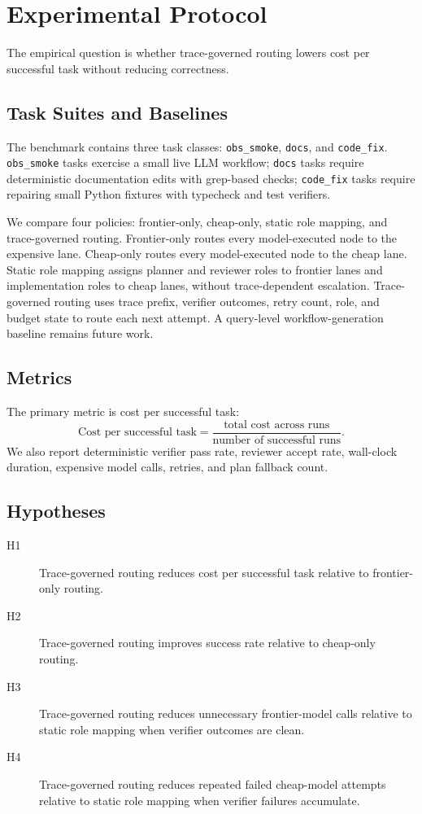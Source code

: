 \documentclass[11pt]{article}
\begin{document}
\section{Experimental Protocol}

The empirical question is whether trace-governed routing lowers cost per
successful task without reducing correctness.

\subsection{Task Suites and Baselines}

The benchmark contains three task classes: \texttt{obs\_smoke},
\texttt{docs}, and \texttt{code\_fix}. \texttt{obs\_smoke} tasks exercise a
small live LLM workflow; \texttt{docs} tasks require deterministic
documentation edits with grep-based checks; \texttt{code\_fix} tasks require
repairing small Python fixtures with typecheck and test verifiers.

We compare four policies: frontier-only, cheap-only, static role mapping, and
trace-governed routing. Frontier-only routes every model-executed node to the
expensive lane. Cheap-only routes every model-executed node to the cheap lane.
Static role mapping assigns planner and reviewer roles to frontier lanes and
implementation roles to cheap lanes, without trace-dependent escalation.
Trace-governed routing uses trace prefix, verifier outcomes, retry count, role,
and budget state to route each next attempt. A query-level workflow-generation
baseline remains future work.

\subsection{Metrics}

The primary metric is cost per successful task:
\[
\text{Cost per successful task}
=
\frac{\text{total cost across runs}}{\text{number of successful runs}}.
\]
We also report deterministic verifier pass rate, reviewer accept rate,
wall-clock duration, expensive model calls, retries, and plan fallback count.

\subsection{Hypotheses}

\begin{description}
  \item[H1] Trace-governed routing reduces cost per successful task relative to
  frontier-only routing.
  \item[H2] Trace-governed routing improves success rate relative to cheap-only
  routing.
  \item[H3] Trace-governed routing reduces unnecessary frontier-model calls
  relative to static role mapping when verifier outcomes are clean.
  \item[H4] Trace-governed routing reduces repeated failed cheap-model attempts
  relative to static role mapping when verifier failures accumulate.
\end{description}
\end{document}
